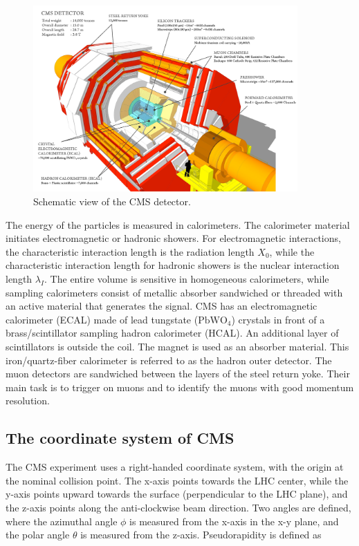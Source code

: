 \begin{figure}[htbp]
  \centering
  \includegraphics[width=0.9\textwidth]{plots/chapter3/cms_layered.png}
  \caption{Schematic view of the CMS detector.}
  \label{fig:cms}
\end{figure}

The energy of the particles is measured in calorimeters. The calorimeter material initiates electromagnetic or hadronic showers. For electromagnetic interactions, the characteristic interaction length is the radiation length $X_0$, while the characteristic interaction length for hadronic showers is the nuclear interaction length $\lambda_I$. The entire volume is sensitive in homogeneous calorimeters, while sampling calorimeters consist of metallic absorber sandwiched or threaded with an active material that generates the signal. CMS has an electromagnetic calorimeter (ECAL) made of lead tungstate ($\text{PbWO}_{4}$) crystals in front of a brass/scintillator sampling hadron calorimeter (HCAL). An additional layer of scintillators is outside the coil. The magnet is used as an absorber material. This iron/quartz-fiber calorimeter is referred to as the hadron outer detector. The muon detectors are sandwiched between the layers of the steel return yoke. Their main task is to trigger on muons and to identify the muons with good momentum resolution.

\subsection{The coordinate system of CMS}
The CMS experiment uses a right-handed coordinate system, with the origin at the nominal collision point. The x-axis points towards the LHC center, while the y-axis points upward towards the surface (perpendicular to the LHC plane), and the z-axis points along the anti-clockwise beam direction. Two angles are defined, where the azimuthal angle $\phi$ is measured from the x-axis in the x-y plane, and the polar angle $\theta$ is measured from the z-axis. Pseudorapidity is defined as


